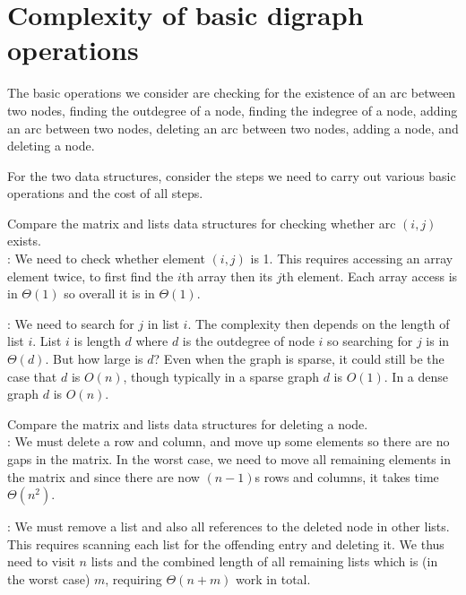 \section{Complexity of basic digraph operations}
The basic operations we consider are checking for the existence of an arc between two nodes, finding the outdegree of a node, 
finding the indegree of a node, adding an arc between two nodes, deleting an arc between two nodes, adding a node, and deleting a node. 

For the two data structures, consider the steps we need to carry out various basic operations and the cost of all steps. 

\begin{Boxample}
Compare the matrix and lists data structures for checking whether arc $(i,j)$ exists.\\

	: 
	We need to check whether element $(i,j)$ is 1. 
	This requires accessing an array element twice, to first find the $i$th array then its $j$th element. 
	Each array access is in $\Theta(1)$ so overall it is in $\Theta(1)$.
	
	: We need to search for $j$ in list $i$. 
	The complexity then depends on the length of list $i$. 
	List $i$ is length $d$ where $d$ is the outdegree of node $i$ so searching for $j$ is in $\Theta(d)$. 
	But how large is $d$? 
	Even when the graph is sparse, it could still be the case that $d$ is $O(n)$,
	though typically in a sparse graph $d$ is $O(1)$.  
	In a dense graph $d$ is $O(n)$.
\end{Boxample}

\begin{Boxample}
Compare the matrix and lists data structures for deleting a node.\\

	: 
	We must delete a row and column, and move up some elements so there are no gaps in the matrix. 
	In the worst case, we need to move all remaining elements in the matrix 
	and since there are now $(n-1)$s rows and columns, it takes time $\Theta(n^2)$.
	
	: 
	We must remove a list and also all references to the deleted node in other lists. 
	This requires scanning each list for the offending entry and deleting it. 
	We thus need to visit $n$ lists and the combined length of all remaining lists which is (in the worst case) $m$, 
	requiring $\Theta(n + m)$ work in total.
\end{Boxample}

